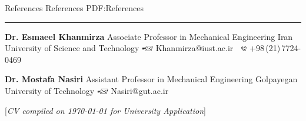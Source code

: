 \documentclass[letterpaper,MMMyyyy,nonstopmode]{ResumeTemplate}
\newcommand{\CVNote}{CV compiled on {\today} for University Application}
\begin{document}
\begin{Body}
\Section
{References}
{References}
{PDF:References}
\textcolor{Forestg}{\vspace{0.05cm}\hrule height 0.1cm}\BigGap
\BulletItem
\textbf{Dr. Esmaeel Khanmirza}
\newline
Associate Professor in Mechanical Engineering
\newline
Iran University of Science and Technology
\newline
\includegraphics[height=7pt]{icons/SendEmail.png} Khanmirza@iust.ac.ir
\,\SubBulletSymbol\,
\includegraphics[height=7pt]{icons/phone1.png} +98\,(21)\,7724-0469

\BigGap
\BulletItem
\textbf{Dr. Mostafa Nasiri}
\newline
Assistant Professor in Mechanical Engineering
\newline
Golpayegan University of Technology
\newline
\includegraphics[height=7pt]{icons/SendEmail.png} Nasiri@gut.ac.ir

\end{Body}


\BigGap
\UseNoteFont%
\null\hfill%
[\textit{\CVNote}]
\end{document}
